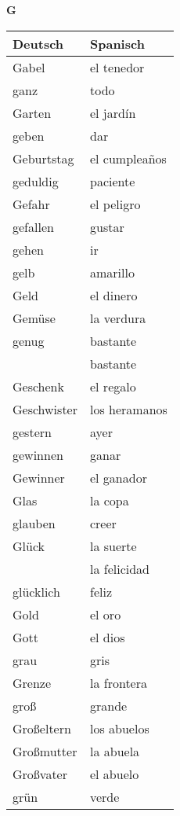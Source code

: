 \begin{flushright}\begin{Huge}\textbf{G}\end{Huge}\end{flushright}

\begin{longtable}{p{} p{}} 
\textbf{Deutsch}     & \textbf{Spanisch}                                       \\ \hline
\hline
\endhead %
Gabel & el tenedor\\
ganz & todo\\
Garten & el jardín\\
geben & dar\\
Geburtstag & el cumpleaños\\
geduldig & paciente\\
Gefahr & el peligro\\
gefallen & gustar\\
gehen & ir\\
gelb & amarillo \\
Geld & el dinero\\
Gemüse & la verdura\\
genug & bastante\\
~ & bastante\\
Geschenk & el regalo\\
Geschwister & los heramanos \\
gestern & ayer\\
gewinnen & ganar\\
Gewinner & el ganador\\
Glas & la copa\\
glauben & creer\\
Glück & la suerte \\
~ & la felicidad \\
glücklich & feliz\\
Gold & el oro\\
Gott & el dios\\
grau & gris \\
Grenze & la frontera\\
groß & grande\\
Großeltern & los abuelos\\
Großmutter & la abuela\\
Großvater & el abuelo\\
grün & verde\\

\end{longtable}
